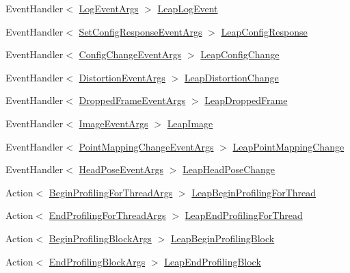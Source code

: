 \begin{DoxyCompactItemize}
\item 
Event\+Handler$<$ \mbox{\hyperlink{class_leap_1_1_log_event_args}{Log\+Event\+Args}} $>$ \mbox{\hyperlink{class_leap_internal_1_1_connection_a435f5b54b81790b604a4ef1f9b630d5e}{Leap\+Log\+Event}}
\item 
Event\+Handler$<$ \mbox{\hyperlink{class_leap_1_1_set_config_response_event_args}{Set\+Config\+Response\+Event\+Args}} $>$ \mbox{\hyperlink{class_leap_internal_1_1_connection_a87dae2d17dfa76d622d710bf69c08c82}{Leap\+Config\+Response}}
\item 
Event\+Handler$<$ \mbox{\hyperlink{class_leap_1_1_config_change_event_args}{Config\+Change\+Event\+Args}} $>$ \mbox{\hyperlink{class_leap_internal_1_1_connection_a6f56c66bbecc957ca227d894dcf16e96}{Leap\+Config\+Change}}
\item 
Event\+Handler$<$ \mbox{\hyperlink{class_leap_1_1_distortion_event_args}{Distortion\+Event\+Args}} $>$ \mbox{\hyperlink{class_leap_internal_1_1_connection_ab1618ad3b9b1ed17ccd43a2461d277d7}{Leap\+Distortion\+Change}}
\item 
Event\+Handler$<$ \mbox{\hyperlink{class_leap_1_1_dropped_frame_event_args}{Dropped\+Frame\+Event\+Args}} $>$ \mbox{\hyperlink{class_leap_internal_1_1_connection_a7542907a2116216ac90ab2a88599b3a6}{Leap\+Dropped\+Frame}}
\item 
Event\+Handler$<$ \mbox{\hyperlink{class_leap_1_1_image_event_args}{Image\+Event\+Args}} $>$ \mbox{\hyperlink{class_leap_internal_1_1_connection_a7ff7e1c77a92cba83e8d59e75f8074db}{Leap\+Image}}
\item 
Event\+Handler$<$ \mbox{\hyperlink{class_leap_1_1_point_mapping_change_event_args}{Point\+Mapping\+Change\+Event\+Args}} $>$ \mbox{\hyperlink{class_leap_internal_1_1_connection_ae000281d4cf2fbced911ff97b31f4035}{Leap\+Point\+Mapping\+Change}}
\item 
Event\+Handler$<$ \mbox{\hyperlink{class_leap_1_1_head_pose_event_args}{Head\+Pose\+Event\+Args}} $>$ \mbox{\hyperlink{class_leap_internal_1_1_connection_ae8fb7ce09bced652e319aada4a8e3755}{Leap\+Head\+Pose\+Change}}
\item 
Action$<$ \mbox{\hyperlink{struct_leap_1_1_begin_profiling_for_thread_args}{Begin\+Profiling\+For\+Thread\+Args}} $>$ \mbox{\hyperlink{class_leap_internal_1_1_connection_a364051da7b95bc1487dac1d7538510b7}{Leap\+Begin\+Profiling\+For\+Thread}}
\item 
Action$<$ \mbox{\hyperlink{struct_leap_1_1_end_profiling_for_thread_args}{End\+Profiling\+For\+Thread\+Args}} $>$ \mbox{\hyperlink{class_leap_internal_1_1_connection_a424896b5a35580707284fa570e40138a}{Leap\+End\+Profiling\+For\+Thread}}
\item 
Action$<$ \mbox{\hyperlink{struct_leap_1_1_begin_profiling_block_args}{Begin\+Profiling\+Block\+Args}} $>$ \mbox{\hyperlink{class_leap_internal_1_1_connection_a377465e1fa8fffca68491ba5f52136a2}{Leap\+Begin\+Profiling\+Block}}
\item 
Action$<$ \mbox{\hyperlink{struct_leap_1_1_end_profiling_block_args}{End\+Profiling\+Block\+Args}} $>$ \mbox{\hyperlink{class_leap_internal_1_1_connection_a2983273b0360e53dc42a7d6c6d2e5893}{Leap\+End\+Profiling\+Block}}
\end{DoxyCompactItemize}
